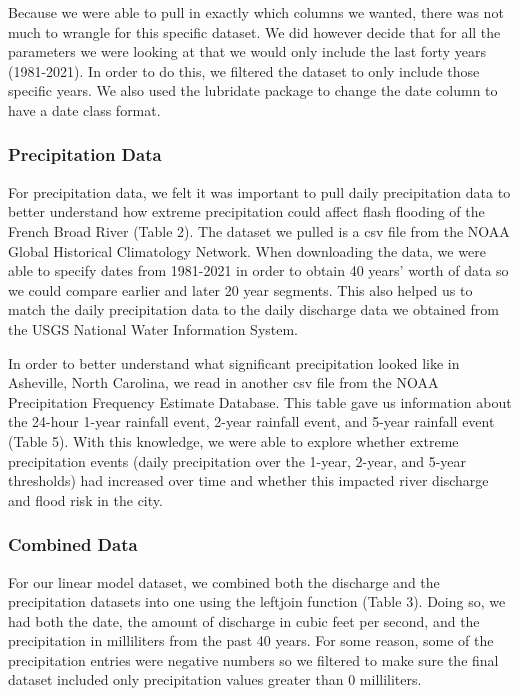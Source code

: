 \documentclass[
]{article}
\begin{document}
Because we were able to pull in exactly which columns we wanted, there
was not much to wrangle for this specific dataset. We did however decide
that for all the parameters we were looking at that we would only
include the last forty years (1981-2021). In order to do this, we
filtered the dataset to only include those specific years. We also used
the lubridate package to change the date column to have a date class
format.

\hypertarget{precipitation-data}{%
\subsubsection{\texorpdfstring{\textbf{Precipitation
Data}}{Precipitation Data}}\label{precipitation-data}}

For precipitation data, we felt it was important to pull daily
precipitation data to better understand how extreme precipitation could
affect flash flooding of the French Broad River (Table 2). The dataset
we pulled is a csv file from the NOAA Global Historical Climatology
Network. When downloading the data, we were able to specify dates from
1981-2021 in order to obtain 40 years' worth of data so we could compare
earlier and later 20 year segments. This also helped us to match the
daily precipitation data to the daily discharge data we obtained from
the USGS National Water Information System.

In order to better understand what significant precipitation looked like
in Asheville, North Carolina, we read in another csv file from the NOAA
Precipitation Frequency Estimate Database. This table gave us
information about the 24-hour 1-year rainfall event, 2-year rainfall
event, and 5-year rainfall event (Table 5). With this knowledge, we were
able to explore whether extreme precipitation events (daily
precipitation over the 1-year, 2-year, and 5-year thresholds) had
increased over time and whether this impacted river discharge and flood
risk in the city.

\hypertarget{combined-data}{%
\subsubsection{\texorpdfstring{\textbf{Combined
Data}}{Combined Data}}\label{combined-data}}

For our linear model dataset, we combined both the discharge and the
precipitation datasets into one using the leftjoin function (Table 3).
Doing so, we had both the date, the amount of discharge in cubic feet
per second, and the precipitation in milliliters from the past 40 years.
For some reason, some of the precipitation entries were negative numbers
so we filtered to make sure the final dataset included only
precipitation values greater than 0 milliliters.
\end{document}
